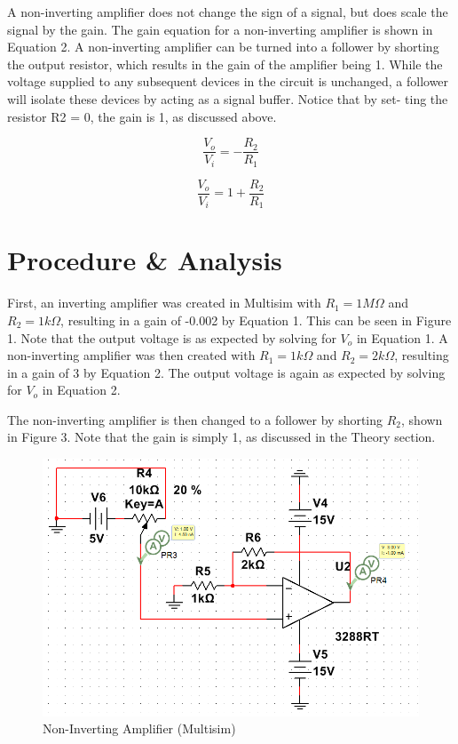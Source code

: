 \documentclass[12pt]{article}
\begin{document}
A non-inverting amplifier does not change the sign of a signal, but does scale the signal by the gain. The gain equation for a non-inverting amplifier is shown in Equation 2. A non-inverting amplifier can be turned into a follower by shorting the output resistor, which results in the gain of the amplifier being 1. While the voltage supplied to any subsequent devices in the circuit is unchanged, a follower will isolate these devices by acting as a signal buffer. Notice that by set- ting the resistor R2 = 0, the gain is 1, as discussed above.
\bigskip
 
\begin{equation}
\frac{V_{o}}{V_{i}} = -\frac{R_{2}}{R_{1}}
\end{equation}
\bigskip

\begin{equation}
\frac{V_{o}}{V_{i}} = 1 + \frac{R_{2}}{R_{1}}
\end{equation}
\bigskip


\section*{\fontsize{12}{12}\selectfont \large Procedure \& Analysis}
First, an inverting amplifier was created in Multisim with $R_{1}= 1M\Omega$ and $R_{2}= 1k\Omega$, resulting in a gain of -0.002 by Equation 1. This can be seen in Figure 1. Note that the output voltage is as expected by solving for $V_{o}$ in Equation 1. A non-inverting amplifier was then created with $R_{1} = 1k\Omega$ and $R_{2} = 2k\Omega$, resulting in a gain of 3 by Equation 2. The output voltage is again as expected by solving for $V_{o}$ in Equation 2. 
\bigskip

The non-inverting amplifier is then changed to a follower by shorting $R_{2}$, shown in Figure 3. Note that the gain is simply 1, as discussed in the Theory section. 

\newpage

\begin{figure}[h!] %
   \centering
   \includegraphics[width=5.5in]{non_inverting_multisim.PNG} 
   \caption{Non-Inverting Amplifier (Multisim)}
   \label{fig:example}
\end{figure}
\end{document}
